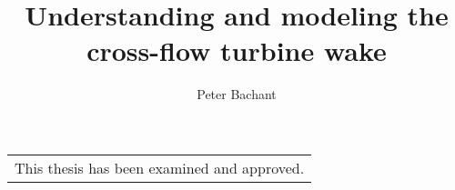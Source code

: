 

\title{Understanding and modeling the cross-flow turbine wake}

\author{Peter Bachant}
 
  
\thesisdate{\today} 
\maketitle



\newpage
\thispagestyle{empty}

\begin{tabular}{l}
\\
\vspace{7.5mm}

This thesis has been examined and approved.

\end{tabular}


